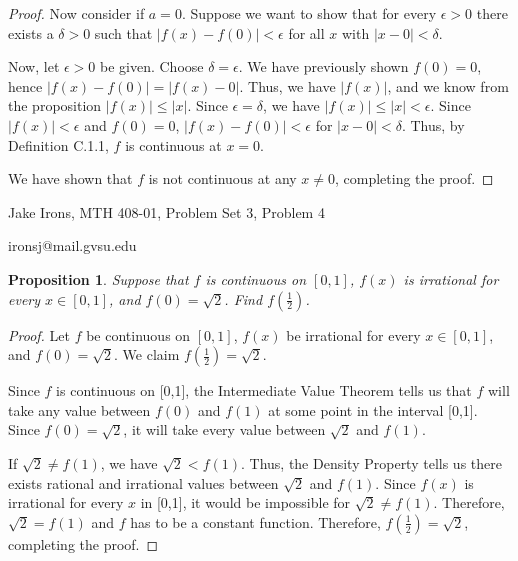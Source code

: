 \documentclass[11 pt]{article}
\newtheorem{proposition}{Proposition}
\newcommand{\newpar}{\vspace{.15in}\noindent}
\begin{document}
\begin{proof}
\newpar
Now consider if $a=0$. Suppose we want to show that for every $\epsilon>0$ there exists a $\delta>0$ such that $\mid f(x)-f(0)\mid<\epsilon$ for all $x$ with $\mid x-0\mid<\delta$. 

\newpar
Now, let $\epsilon>0$ be given. Choose $\delta=\epsilon$. We have previously shown $f(0)=0$, hence $\lvert f(x)-f(0)\rvert=\lvert f(x)-0\rvert$. Thus, we have $\lvert f(x)\rvert$, and we know from the proposition $\lvert f(x)\rvert\le\lvert x\rvert$. Since $\epsilon=\delta$, we have $\lvert f(x)\rvert\le\lvert x\rvert<\epsilon$. Since $\lvert f(x)\rvert<\epsilon$ and $f(0)=0$, $\lvert f(x)-f(0)\rvert<\epsilon$ for $\lvert x-0\rvert<\delta$. Thus, by Definition C.1.1, $f$ is continuous at $x=0$.

\newpar
We have shown that $f$ is not continuous at any $x\neq 0$, completing the proof. 

\end{proof}
\newpage
\noindent Jake Irons, MTH 408-01, Problem Set 3, Problem 4

\noindent ironsj@mail.gvsu.edu
\newpar
\begin{proposition}
Suppose that $f$ is continuous on $[0, 1]$, $f(x)$ is irrational for every $x\in[0, 1]$, and $f(0)=\sqrt{2}$. Find $f(\frac{1}{2})$.
\end{proposition}
\begin{proof}
Let $f$ be continuous on $[0, 1]$, $f(x)$ be irrational for every $x\in[0, 1]$, and $f(0)=\sqrt{2}$. We claim $f(\frac{1}{2})=\sqrt{2}$. 

\newpar
Since $f$ is continuous on [0,1], the Intermediate Value Theorem tells us that $f$ will take any value between $f(0)$ and $f(1)$ at some point in the interval [0,1]. Since $f(0)=\sqrt{2}$, it will take every value between $\sqrt{2}$ and $f(1)$. 

\newpar
If $\sqrt{2}\neq f(1)$, we have $\sqrt{2}<f(1)$. Thus, the Density Property tells us there exists rational and irrational values between $\sqrt{2}$ and $f(1)$. Since $f(x)$ is irrational for every $x$ in [0,1], it would be impossible for $\sqrt{2}\neq f(1)$. Therefore, $\sqrt{2}=f(1)$ and $f$ has to be a constant function. Therefore, $f(\frac{1}{2})=\sqrt{2}$, completing the proof.


\end{proof}
\end{document}
